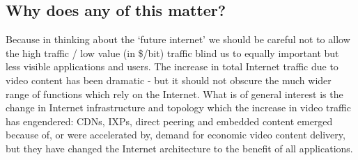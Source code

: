 \subsection{Why does any of this matter?}

Because in thinking about the ‘future internet’ we should be careful not to allow the high traffic / low value (in \$/bit) traffic blind us to equally important but less visible applications and users.
The increase in total Internet traffic due to video content has been dramatic - but it should not obscure the much wider range of functions which rely on the Internet.
What is of general interest is the change in Internet infrastructure and topology which the increase in video traffic has engendered: CDNs, IXPs, direct peering and embedded content emerged because of, or were accelerated by, demand for economic video content delivery, but they have changed the Internet architecture to the benefit of all applications.
